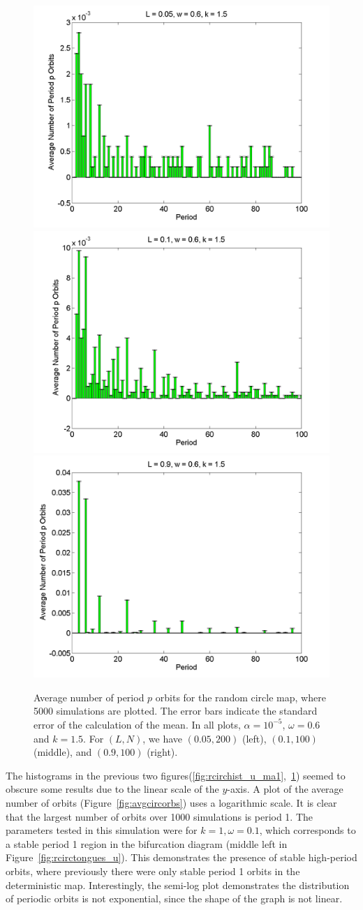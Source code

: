 \begin{figure}[H]\linespread{1}
\caption[Average number of period $p$ orbits for the random circle
map (uniform distribution), for $\alpha=10^{-5}$, $\omega=0.6$ and $k=1.5$]{Average number of period $p$ orbits for the random circle
map, where 5000 simulations are plotted. The error bars indicate
the standard error of the calculation of the mean. In all plots,
$\alpha = 10^{-5}$, $\omega=0.6$ and $k=1.5$. For $(L,N)$,
we have $(0.05, 200)$ (left), $(0.1, 100)$
(middle), and $(0.9, 100)$ (right).}\label{fig:rcirchist_u_ma2}
	\begin{center}	\includegraphics[width=.33\textwidth]{figs/rcirc_hist_u_L_005_w_06_k_15_sims_5000.png}\hfill
\includegraphics[width=.33\textwidth]{figs/rcirc_hist_u_L_01_w_06_k_15_sims_5000.png}\hfill
\includegraphics[width=.33\textwidth]{figs/rcirc_hist_u_L_09_w_06_k_15_sims_5000.png}
	\end{center}
\end{figure}

The histograms in the previous two
figures(\ref{fig:rcirchist_u_ma1},~\ref{fig:rcirchist_u_ma2}) seemed
to obscure some results due to the linear scale of the $y$-axis. A plot of the average number of orbits
(Figure~\ref{fig:avgcircorbs}) uses a logarithmic scale. It is clear
that the largest number of orbits over 1000
simulations is period 1. The parameters tested in this simulation were
for $k=1, \omega=0.1$, which corresponds to a stable period 1 region
in the bifurcation diagram (middle left in
Figure~\ref{fig:rcirctongues_u}). This demonstrates the presence of
stable high-period orbits, where previously there were only
stable period 1 orbits in the deterministic map. Interestingly, the
semi-log plot demonstrates the distribution of periodic orbits is not
exponential, since the shape of the graph is not linear.

